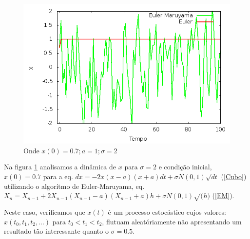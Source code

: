 \begin{figure}[!htb]
\centering
\begin{minipage}[b]{0.55\linewidth}
\includegraphics[width=\linewidth]{./img/Langevin_CI07_ruido2.png}
\caption{Onde $x(0) = 0.7 ; a = 1 ; \sigma = 2$}
\label{fig4}
\end{minipage} \hfill
\end{figure}

Na figura \ref{fig4} analisamos a dinâmica de ${x}$ para ${\sigma} = 2$ e condição inicial, $x(0) = 0.7$ para a eq. ${dx} = -2x(x-a)(x+a)dt + \sigma N(0,1) \sqrt{dt}$ (\ref{Cubo}) utilizando o algorítmo de Euler-Maruyama, 
eq. $X_n = X_{n-1} + 2X_{n-1}(X_{n-1} - a)(X_{n-1} + a)h + \sigma N(0,1) \sqrt(h)$ (\ref{EM}).

Neste caso, verificamos que $x(t)$ é um processo estocástico cujos valores: $x(t_{0}, t_{1}, t_{2},...)$ para 
$t_{0} < t_{1} < t_{2}$, flutuam aleatóriamente não apresentando um resultado tão interessante quanto o $\sigma = 0.5$.